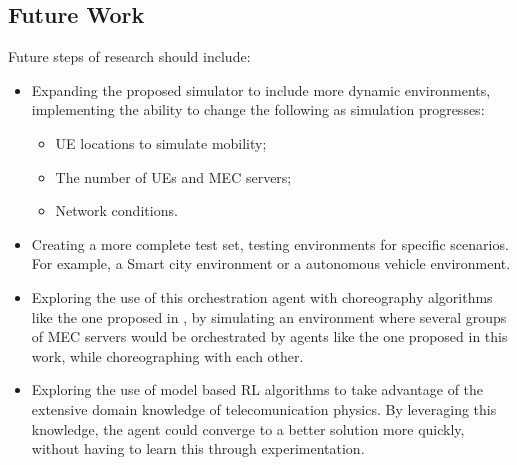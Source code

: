 \documentclass[conference]{IEEEtran}
\begin{document}
\subsection{Future Work}
\noindent Future steps of research should include:
\begin{itemize}
    \item Expanding the proposed simulator to include more dynamic environments, implementing the ability to change the following as simulation progresses:
    \begin{itemize}
      \item \acrshort{UE} locations to simulate mobility;
      \item The number of \acrshort{UE}s and \acrshort{MEC} servers;
      \item Network conditions.
    \end{itemize}
    \item Creating a more complete test set, testing environments for specific scenarios. For example, a Smart city environment or a autonomous vehicle environment. 
    \item Exploring the use of this orchestration agent with choreography algorithms like the one proposed in \cite{Lulu}, by simulating an environment where several groups of \acrshort{MEC} servers would be orchestrated by agents like the one proposed in this work, while choreographing with each other.
    \item Exploring the use of model based \acrshort{RL} algorithms to take advantage of the extensive domain knowledge of telecomunication physics. By leveraging this knowledge, the agent could converge to a better solution more quickly, without having to learn this through experimentation.
\end{itemize}
\end{document}
